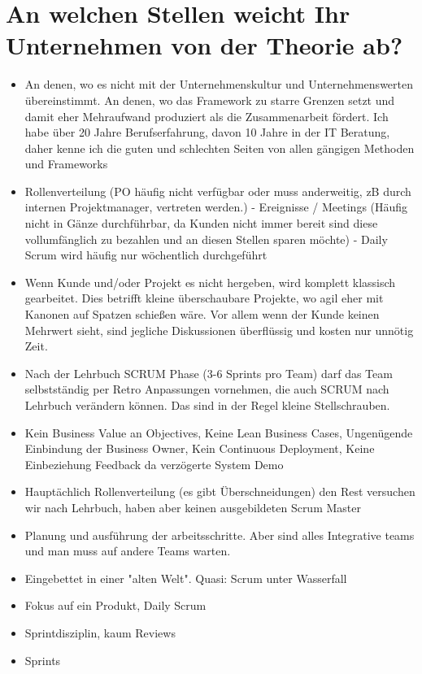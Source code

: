 \section*{An welchen Stellen weicht Ihr Unternehmen von der Theorie ab?}
\begin{itemize}
    \item[\openresponse] An denen, wo es nicht mit der Unternehmenskultur und Unternehmenswerten übereinstimmt. An denen, wo das Framework zu starre Grenzen setzt und damit eher Mehraufwand produziert als die Zusammenarbeit fördert. Ich habe über 20 Jahre Berufserfahrung, davon 10 Jahre in der IT Beratung, daher kenne ich die guten und schlechten Seiten von allen gängigen Methoden und Frameworks
    \item[\openresponse] Rollenverteilung (PO häufig nicht verfügbar oder muss anderweitig, zB durch internen Projektmanager, vertreten werden.) - Ereignisse / Meetings (Häufig nicht in Gänze durchführbar, da Kunden nicht immer bereit sind diese vollumfänglich zu bezahlen und an diesen Stellen sparen möchte) - Daily Scrum wird häufig nur wöchentlich durchgeführt
    \item[\openresponse] Wenn Kunde und/oder Projekt es nicht hergeben, wird komplett klassisch gearbeitet. Dies betrifft kleine überschaubare Projekte, wo agil eher mit Kanonen auf Spatzen schießen wäre. Vor allem wenn der Kunde keinen Mehrwert sieht, sind jegliche Diskussionen überflüssig und kosten nur unnötig Zeit.
    \item[\openresponse] Nach der Lehrbuch SCRUM Phase (3-6 Sprints pro Team) darf das Team selbstständig per Retro Anpassungen vornehmen, die auch SCRUM nach Lehrbuch verändern können. Das sind in der Regel kleine Stellschrauben.
    \item[\openresponse] Kein Business Value an Objectives, Keine Lean Business Cases, Ungenügende Einbindung der Business Owner, Kein Continuous Deployment, Keine Einbeziehung Feedback da verzögerte System Demo
    \item[\openresponse] Hauptächlich Rollenverteilung (es gibt Überschneidungen) den Rest versuchen wir nach Lehrbuch, haben aber keinen ausgebildeten Scrum Master
    \item[\openresponse] Planung und ausführung der arbeitsschritte. Aber sind alles Integrative teams und man muss auf andere Teams warten.
    \item[\openresponse] Eingebettet in einer "alten Welt". Quasi: Scrum unter Wasserfall
    \item[\openresponse] Fokus auf ein Produkt, Daily Scrum
    \item[\openresponse] Sprintdisziplin, kaum Reviews
    \item[\openresponse] Sprints
\end{itemize}

